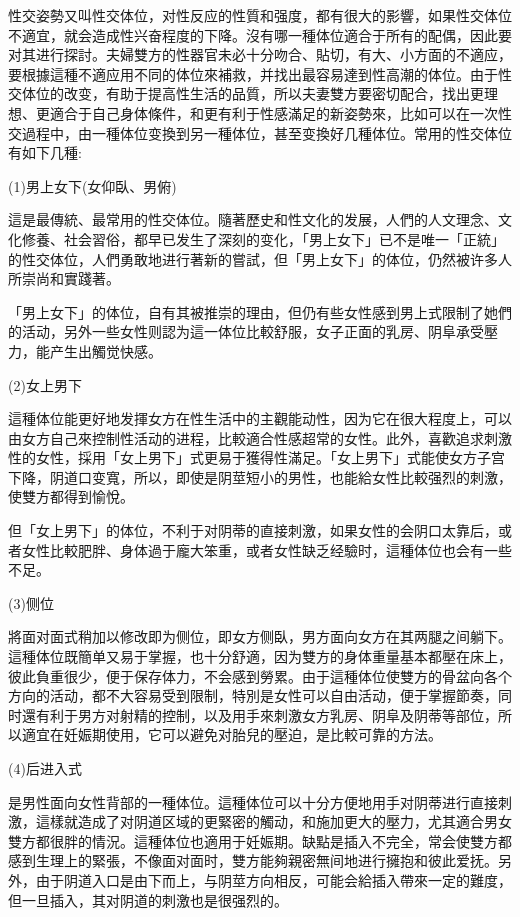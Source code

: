 \documentclass[12pt,UTF8]{ctexbook}
\begin{document}
性交姿勢又叫性交体位，对性反应的性質和强度，都有很大的影響，如果性交体位不適宜，就会造成性兴奋程度的下降。沒有哪一種体位適合于所有的配偶，因此要对其进行探討。夫婦雙方的性器官未必十分吻合、貼切，有大、小方面的不適应，要根據這種不適应用不同的体位來補救，并找出最容易達到性高潮的体位。由于性交体位的改变，有助于提高性生活的品質，所以夫妻雙方要密切配合，找出更理想、更適合于自己身体條件，和更有利于性感滿足的新姿勢來，比如可以在一次性交過程中，由一種体位变換到另一種体位，甚至变換好几種体位。常用的性交体位有如下几種:

(1)男上女下(女仰臥、男俯)

這是最傳統、最常用的性交体位。隨著歷史和性文化的发展，人們的人文理念、文化修養、社会習俗，都早已发生了深刻的变化，「男上女下」已不是唯一「正統」的性交体位，人們勇敢地进行著新的嘗試，但「男上女下」的体位，仍然被许多人所崇尚和實踐著。

「男上女下」的体位，自有其被推崇的理由，但仍有些女性感到男上式限制了她們的活动，另外一些女性则認为這一体位比較舒服，女子正面的乳房、阴阜承受壓力，能产生出觸觉快感。

(2)女上男下

這種体位能更好地发揮女方在性生活中的主觀能动性，因为它在很大程度上，可以由女方自己來控制性活动的进程，比較適合性感超常的女性。此外，喜歡追求刺激性的女性，採用「女上男下」式更易于獲得性滿足。「女上男下」式能使女方子宫下降，阴道口变寬，所以，即使是阴莖短小的男性，也能給女性比較强烈的刺激，使雙方都得到愉悅。

但「女上男下」的体位，不利于对阴蒂的直接刺激，如果女性的会阴口太靠后，或者女性比較肥胖、身体過于龐大笨重，或者女性缺乏经驗时，這種体位也会有一些不足。

(3)侧位

將面对面式稍加以修改即为侧位，即女方侧臥，男方面向女方在其两腿之间躺下。這種体位既簡单又易于掌握，也十分舒適，因为雙方的身体重量基本都壓在床上，彼此負重很少，便于保存体力，不会感到勞累。由于這種体位使雙方的骨盆向各个方向的活动，都不大容易受到限制，特別是女性可以自由活动，便于掌握節奏，同时還有利于男方对射精的控制，以及用手來刺激女方乳房、阴阜及阴蒂等部位，所以適宜在妊娠期使用，它可以避免对胎兒的壓迫，是比較可靠的方法。

(4)后进入式

是男性面向女性背部的一種体位。這種体位可以十分方便地用手对阴蒂进行直接刺激，這樣就造成了对阴道区域的更緊密的觸动，和施加更大的壓力，尤其適合男女雙方都很胖的情況。這種体位也適用于妊娠期。缺點是插入不完全，常会使雙方都感到生理上的緊張，不像面对面时，雙方能夠親密無间地进行擁抱和彼此爱抚。另外，由于阴道入口是由下而上，与阴莖方向相反，可能会給插入帶來一定的難度，但一旦插入，其对阴道的刺激也是很强烈的。
\end{document}
